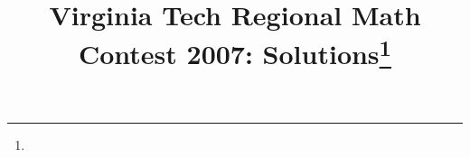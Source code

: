 \documentclass[10pt]{article}
\begin{document}
\title{Virginia Tech Regional Math Contest 2007: Solutions\footnote{\disclaimer}}
\author{\vspace{-2ex}}
\date{\vspace{-5ex}} %
\maketitle

%

%

%

%

%

%

%
\end{document}
